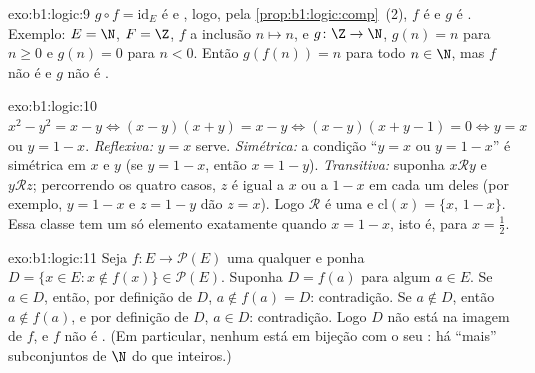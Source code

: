 \begin{solution}{exo:b1:logic:9}
$g \circ f = \mathrm{id}_E$ é  e , logo, pela
\cref{prop:b1:logic:comp}~(2), $f$ é  e $g$ é .
Exemplo: $E = \N$, $F = \Z$, $f$ a inclusão $n \mapsto n$, e
$g \colon \Z \to \N$, $g(n) = n$ para $n \geq 0$ e $g(n) = 0$ para
$n < 0$. Então $g(f(n)) = n$ para todo $n \in \N$, mas $f$ não é
 e $g$ não é .
\end{solution}

\begin{solution}{exo:b1:logic:10}
$x^2 - y^2 = x - y \iff (x - y)(x + y) = x - y \iff (x - y)(x + y - 1)
= 0 \iff y = x$ ou $y = 1 - x$. \emph{Reflexiva:} $y = x$ serve.
\emph{Simétrica:} a condição ``$y = x$ ou $y = 1 - x$'' é
simétrica em $x$ e $y$ (se $y = 1 - x$, então $x = 1 - y$).
\emph{Transitiva:} suponha $x \mathbin{\mathcal{R}} y$ e $y
\mathbin{\mathcal{R}} z$; percorrendo os quatro casos, $z$ é igual a $x$
ou a $1 - x$ em cada um deles (por exemplo, $y = 1 - x$ e $z = 1 - y$ dão $z = x$).
Logo $\mathcal{R}$ é uma  e $\mathrm{cl}(x) =
\{x,\, 1 - x\}$. Essa classe tem um só elemento exatamente quando $x = 1 - x$,
isto é, para $x = \frac12$.
\end{solution}

\begin{solution}{exo:b1:logic:11}
Seja $f \colon E \to \mathcal{P}(E)$ uma  qualquer e ponha
$D = \{x \in E : x \notin f(x)\} \in \mathcal{P}(E)$. Suponha $D =
f(a)$ para algum $a \in E$. Se $a \in D$, então, por definição de $D$,
$a \notin f(a) = D$: contradição. Se $a \notin D$, então $a \notin
f(a)$, e por definição de $D$, $a \in D$: contradição. Logo $D$ não
está na imagem de $f$, e $f$ não é . (Em particular, nenhum
 está em bijeção com o seu : há ``mais''
subconjuntos de $\N$ do que inteiros.)
\end{solution}

